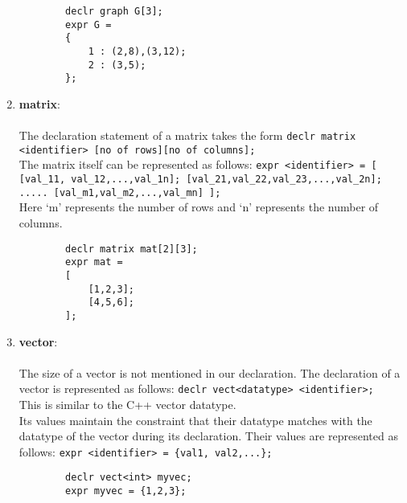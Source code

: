 \documentclass[journal, 18pt]{report}
\begin{document}
\begin{enumerate}
\begin{lstlisting}
        declr graph G[3];
        expr G = 
        {
            1 : (2,8),(3,12);
            2 : (3,5);
        };
    \end{lstlisting}
    \item \textbf{matrix}:\\\\
    The declaration statement of a matrix takes the form \texttt{declr matrix <identifier> [no of rows][no of columns];}\\
    The matrix itself can be represented as follows: \texttt{expr <identifier> = [ [val\_11, val\_12,...,val\_1n]; [val\_21,val\_22,val\_23,...,val\_2n]; ..... [val\_m1,val\_m2,...,val\_mn] ];}\\
    Here `m' represents the number of rows and `n' represents the number of columns.\\
    \begin{lstlisting}
        declr matrix mat[2][3];
        expr mat = 
        [
            [1,2,3];
            [4,5,6];
        ];
    \end{lstlisting}
    \item \textbf{vector}:\\\\
    The size of a vector is not mentioned in our declaration. The declaration of a vector is represented as follows: \texttt{declr vect<datatype> <identifier>;}\\
    This is similar to the C++ vector datatype.\\
    Its values maintain the constraint that their datatype matches with the datatype of the vector during its declaration. Their values are represented as follows: \texttt{expr <identifier> = \{val1, val2,...\};}\\
    \begin{lstlisting}
        declr vect<int> myvec;
        expr myvec = {1,2,3};
    \end{lstlisting}
\end{enumerate}
\end{document}

